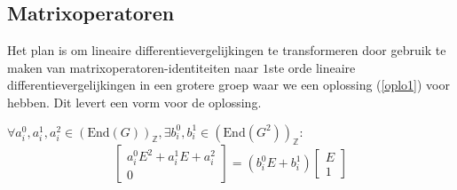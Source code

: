 \documentclass[a4paper,12pt]{article}
\begin{document}
\subsection{Matrixoperatoren}
Het plan is om lineaire differentievergelijkingen te transformeren door gebruik te maken van
matrixoperatoren-identiteiten naar $1$ste orde lineaire differentievergelijkingen in een grotere groep waar
we een oplossing (\ref{oplo1}) voor hebben. Dit levert een vorm voor de oplossing.


\begin{theorem}
    $\forall a_i^0,a_i^1,a_i^2 \in (\text{End}(G))_\mathbb{Z}, \exists b_i^0,b_i^1 \in  (\text{End}(G^2))_\mathbb{Z}:$
    $$
        \left[ {
                    \begin{array}{c}
                        a_i^0E^2+a_i^1E+a_i^2 \\
                        0
                    \end{array} } \right]
        =
        \left(
        b_i^0E+b_i^1\right)
        \left[ {
                    \begin{array}{c}
                        E \\
                        1
                    \end{array} } \right]
    $$

\end{theorem}
\end{document}
